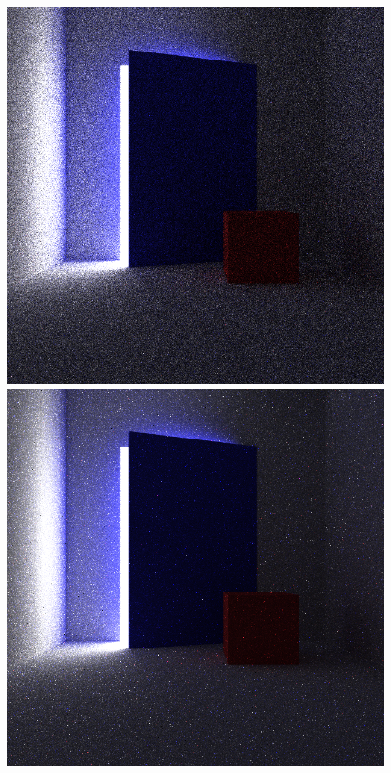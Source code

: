 \documentclass[ %
                    author={Callum Pearce},
                supervisor={Dr. Neill Campbell},
                    degree={MEng},
                     title={Learning the incident radiance for a continuous state space rather than a discrete one is more beneficial for Importance Sampling in Monte Carlo Path tracing},
                  subtitle={},
                      type={research},
                      year={2019} ]{dissertation}
\begin{document}
\begin{figure}[h]
\centering
{}
  \includegraphics[width=\textwidth]{images/renders/door_room/default.png}   
\endminipage\hspace{1em}
  \includegraphics[width=\textwidth]{images/renders/door_room/sarsa.png}   

\end{figure}
\end{document}

